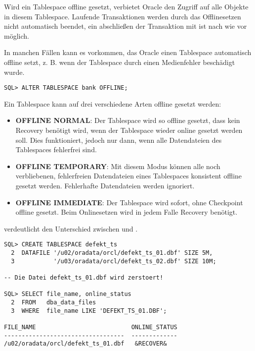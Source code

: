           Wird ein Tablespace offline gesetzt, verbietet Oracle den Zugriff auf alle Objekte in diesem Tablespace. Laufende Transaktionen werden durch das Offlinesetzen nicht automatisch beendet, ein abschließen der Transaktion mit  ist nach wie vor möglich.

          In manchen Fällen kann es vorkommen, das Oracle einen Tablespace automatisch offline setzt, z. B. wenn der Tablespace durch einen Medienfehler beschädigt wurde.
          \begin{lstlisting}[caption={Einen Tablespace offline setzen},label=admin111,language=oracle_sql]
SQL> ALTER TABLESPACE bank OFFLINE;
          \end{lstlisting}
          Ein Tablespace kann auf drei verschiedene Arten offline gesetzt werden:
          \begin{itemize}
            \item \textbf{OFFLINE NORMAL}: Der Tablespace wird so offline gesetzt, dass kein Recovery benötigt wird, wenn der Tablespace wieder online gesetzt werden soll. Dies funktioniert, jedoch nur dann, wenn alle Datendateien des Tablespaces fehlerfrei sind.
            \item \textbf{OFFLINE TEMPORARY}: Mit diesem Modus können alle noch verbliebenen, fehlerfreien Datendateien eines Tablespaces konsistent offline gesetzt werden. Fehlerhafte Datendateien werden ignoriert.
            \item \textbf{OFFLINE IMMEDIATE}: Der Tablespace wird sofort, ohne Checkpoint offline gesetzt. Beim Onlinesetzen wird in jedem Falle Recovery benötigt.
          \end{itemize}
           verdeutlicht den Unterschied zwischen  und .
          \begin{lstlisting}[caption={Der Unterschied zwischen NORMAL und TEMPORARY},label=admin112,language=oracle_sql]
SQL> CREATE TABLESPACE defekt_ts
  2  DATAFILE '/u02/oradata/orcl/defekt_ts_01.dbf' SIZE 5M,
  3           '/u03/oradata/orcl/defekt_ts_02.dbf' SIZE 10M;

-- Die Datei defekt_ts_01.dbf wird zerstoert!

SQL> SELECT file_name, online_status
  2  FROM   dba_data_files
  3  WHERE  file_name LIKE 'DEFEKT_TS_01.DBF';

FILE_NAME                           ONLINE_STATUS
----------------------------------  -------------
/u02/oradata/orcl/defekt_ts_01.dbf   &RECOVER&
          \end{lstlisting}
